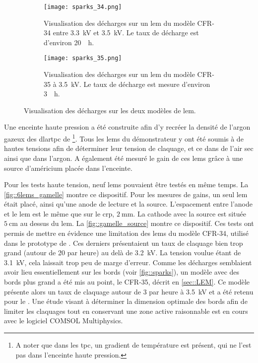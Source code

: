       \begin{figure}[htpb]
        \begin{subfigure}[t]{0.48\textwidth}
          \centering
          \texttt{[image: sparks\_34.png]}
          \caption{\label{fig::sparks_34}Visualisation des décharges sur un \gls{lem} du modèle CFR-34 entre \SI{3.3}{\kilo\volt} et \SI{3.5}{\kilo\volt}. Le taux de décharge est d'environ \SI{20}{\per\hour}.}
        \end{subfigure}
        \hfill
        \begin{subfigure}[t]{0.48\textwidth}
          \centering
          \texttt{[image: sparks\_35.png]}
          \caption{\label{fig::sparks_35}Visualisation des décharges sur un \gls{lem} du modèle CFR-35 à \SI{3.5}{\kilo\volt}. Le taux de décharge est mesure d'environ \SI{3}{\per\hour}.}
        \end{subfigure}
        \caption[Visualisation des décharges sur les deux modèles de \gls{lem}.]{\label{fig::sparks}Visualisation des décharges sur les deux modèles de \gls{lem}.}
      \end{figure}

      Une enceinte haute pression a été construite afin d'y recréer la densité de l'argon gazeux des \gls{dlartpc} de \protodp{}\footnote{A noter que dans les \gls{tpc}, un gradient de température est présent, qui ne l'est pas dans l'enceinte haute pression.}. Tous les \glspl{lem} du démonstrateur \SSS{} y ont été soumis à de hautes tensions afin de déterminer leur tension de claquage, et ce dans de l'air sec ainsi que dans l'argon. A également été mesuré le gain de ces \glspl{lem} grâce à une source d'américium placée dans l'enceinte.
            
      Pour les tests haute tension, neuf \glspl{lem} pouvaient être testés en même temps. La \autoref{fig::6lems_gamelle} montre  ce dispositif. Pour les mesures de gains, un seul \gls{lem} était placé, ainsi qu'une anode de lecture et la source. L'espacement entre l'anode et le \gls{lem} est le même que sur le \gls{crp}, $\SI{2}{\milli\meter}$. La cathode avec la source est située $\SI{5}{\centi\meter}$ au dessus du \gls{lem}. La \autoref{fig::gamelle_source} montre ce dispositif. Ces tests ont permis de mettre en évidence une limitation des \glspl{lem} du modèle CFR-34, utilisé dans le prototype de \TOO{}. Ces derniers présentaient un taux de claquage bien trop grand (autour de 20 par heure) au delà de \SI{3.2}{\kilo\volt}. La tension voulue étant de \SI{3.1}{\kilo\volt}, cela laissait trop peu de marge d'erreur. Comme les décharges semblaient avoir lieu essentiellement sur les bords (voir \autoref{fig::sparks}), un modèle avec des bords plus grand a été mis au point, le CFR-35, décrit en \autoref{sec::LEM}. Ce modèle présente alors un taux de claquage autour de 3 par heure à \SI{3.5}{\kilo\volt} et a été retenu pour le \SSS{}. Une étude visant à déterminer la dimension optimale des bords afin de limiter les claquages tout en conservant une zone active raisonnable est en cours avec le logiciel COMSOL Multiphysics.

